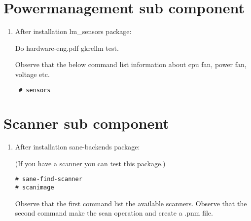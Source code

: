 \documentclass[a4paper,10pt]{article}
\begin{document}
\section{Powermanagement sub component}
\begin{enumerate}
 \item After installation lm\_sensors package:

Do hardware-eng.pdf gkrellm test.

Observe that the below command list information about cpu fan, power fan, voltage etc.
\begin{verbatim}
 # sensors 
\end{verbatim}

\end{enumerate}

\section{Scanner sub component}
\begin{enumerate}
\item After installation sane-backends package:

(If you have a scanner you can test this package.)
\begin{verbatim}
# sane-find-scanner
# scanimage 
\end{verbatim}

Observe that the first command list the available scanners.
Observe that the second command make the scan operation and create a .pnm file.
\end{enumerate}
\end{document}
